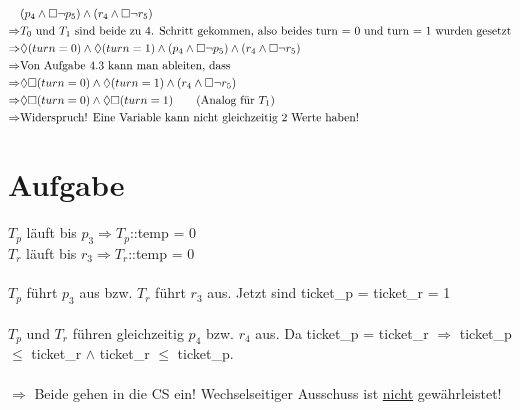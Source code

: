 \begin{align}
	& (p_4 \land \square \neg p_5) \land (r_4 \land \square \neg r_5) \\
	\Rightarrow & \text{$T_0$ und $T_1$ sind beide zu 4. Schritt gekommen, also beides turn = 0 und turn = 1 wurden gesetzt} \\
	\Rightarrow & \lozenge (turn = 0) \land \lozenge (turn = 1) \land (p_4 \land \square \neg p_5) \land (r_4 \land \square \neg r_5) \\
	\Rightarrow & \text{Von Aufgabe 4.3 kann man ableiten, dass} \\
	\Rightarrow & \lozenge \square (turn = 0) \land \lozenge (turn = 1) \land (r_4 \land \square \neg r_5) \\
	\Rightarrow & \lozenge \square (turn = 0) \land \lozenge \square (turn = 1) \tag{\text{Analog für $T_1$}} \\
	\Rightarrow & \text{Widerspruch! Eine Variable kann nicht gleichzeitig 2 Werte haben!}
\end{align}

\section{Aufgabe}

$T_p$ läuft bis $p_3 \Rightarrow T_p$::temp = 0 \\
$T_r$ läuft bis $r_3 \Rightarrow T_r$::temp = 0 \\ \\
$T_p$ führt $p_3$ aus bzw. $T_r$ führt $r_3$ aus. Jetzt sind ticket\_p = ticket\_r = 1 \\ \\
$T_p$ und $T_r$ führen gleichzeitig $p_4$ bzw. $r_4$ aus. Da ticket\_p = ticket\_r $\Rightarrow$ ticket\_p $\leq$ ticket\_r $\land$ ticket\_r $\leq$ ticket\_p. \\ \\
$\Rightarrow$ Beide gehen in die CS ein! Wechselseitiger Ausschuss ist \underline{nicht} gewährleistet!

